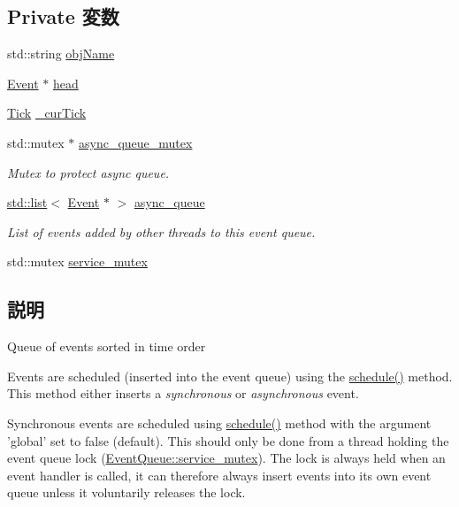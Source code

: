 \subsection*{Private 変数}
\begin{DoxyCompactItemize}
\item 
std::string \hyperlink{classEventQueue_acdd07b78b47375ca2a51a7a956b1697f}{objName}
\item 
\hyperlink{classEvent}{Event} $\ast$ \hyperlink{classEventQueue_a08321f57dbffd90b5b365a6d53bb2933}{head}
\item 
\hyperlink{base_2types_8hh_a5c8ed81b7d238c9083e1037ba6d61643}{Tick} \hyperlink{classEventQueue_a09b29d670564770f8cde7490c4fa4ebb}{\_\-curTick}
\item 
std::mutex $\ast$ \hyperlink{classEventQueue_a7d6bb496422e204e32492a7012a44b66}{async\_\-queue\_\-mutex}
\begin{DoxyCompactList}\small\item\em Mutex to protect async queue. \item\end{DoxyCompactList}\item 
\hyperlink{classstd_1_1list}{std::list}$<$ \hyperlink{classEvent}{Event} $\ast$ $>$ \hyperlink{classEventQueue_a9c9b5322e34950b9d27abca2b8207ca9}{async\_\-queue}
\begin{DoxyCompactList}\small\item\em List of events added by other threads to this event queue. \item\end{DoxyCompactList}\item 
std::mutex \hyperlink{classEventQueue_acfc3095049c7deadb02a9eee0ec54a13}{service\_\-mutex}
\end{DoxyCompactItemize}


\subsection{説明}
Queue of events sorted in time order

Events are scheduled (inserted into the event queue) using the \hyperlink{classEventQueue_a6e13c0d68fbc26df6eff27313813b8a4}{schedule()} method. This method either inserts a {\itshape synchronous\/} or {\itshape asynchronous\/} event.

Synchronous events are scheduled using \hyperlink{classEventQueue_a6e13c0d68fbc26df6eff27313813b8a4}{schedule()} method with the argument 'global' set to false (default). This should only be done from a thread holding the event queue lock (\hyperlink{classEventQueue_acfc3095049c7deadb02a9eee0ec54a13}{EventQueue::service\_\-mutex}). The lock is always held when an event handler is called, it can therefore always insert events into its own event queue unless it voluntarily releases the lock.


